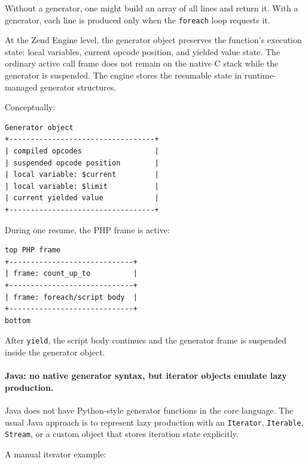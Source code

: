 Without a generator, one might build an array of all lines and return it. With a generator, each line is produced only when the \texttt{foreach} loop requests it.

At the Zend Engine level, the generator object preserves the function's execution state: local variables, current opcode position, and yielded value state. The ordinary active call frame does not remain on the native C stack while the generator is suspended. The engine stores the resumable state in runtime-managed generator structures.

Conceptually:

\begin{verbatim}
Generator object
+----------------------------------+
| compiled opcodes                 |
| suspended opcode position        |
| local variable: $current         |
| local variable: $limit           |
| current yielded value            |
+----------------------------------+
\end{verbatim}

During one resume, the PHP frame is active:

\begin{verbatim}
top PHP frame
+-----------------------------+
| frame: count_up_to          |
+-----------------------------+
| frame: foreach/script body  |
+-----------------------------+
bottom
\end{verbatim}

After \texttt{yield}, the script body continues and the generator frame is suspended inside the generator object.

\paragraph{Java: no native generator syntax, but iterator objects emulate lazy production.}

Java does not have Python-style generator functions in the core language. The usual Java approach is to represent lazy production with an \texttt{Iterator}, \texttt{Iterable}, \texttt{Stream}, or a custom object that stores iteration state explicitly.

A manual iterator example:

